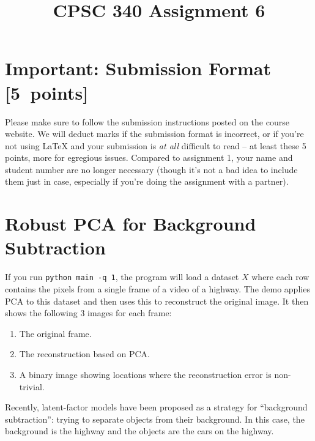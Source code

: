 \documentclass{article}
\newcommand{\blu}[1]{{\textcolor{blu}{#1}}}
\let\ask\blu
\newcommand\pts[1]{\textcolor{pointscolour}{[#1~points]}}
\begin{document}
\title{CPSC 340 Assignment 6}
\date{}
\maketitle

\vspace{-7em}



\section*{Important: Submission Format \pts{5}}

Please make sure to follow the submission instructions posted on the course website.
\ask{We will deduct marks if the submission format is incorrect, or if you're not using \LaTeX{} and your submission is \emph{at all} difficult to read} -- at least these 5 points, more for egregious issues.
Compared to assignment 1, your name and student number are no longer necessary (though it's not a bad idea to include them just in case, especially if you're doing the assignment with a partner).

\vspace{1em}

\section{Robust PCA for Background Subtraction}

If you run \verb|python main -q 1|, the program will load a dataset $X$ where each row contains the pixels from a single frame of a video of a highway. The demo applies PCA to this dataset and then uses this to reconstruct the original image.
It then shows the following 3 images for each frame:
\begin{enumerate}
	\item The original frame.
	\item The reconstruction based on PCA.
	\item A binary image showing locations where the reconstruction error is non-trivial.
\end{enumerate}
Recently, latent-factor models have been proposed as a strategy for ``background subtraction'': trying to separate objects from their background. In this case, the background is the highway and the objects are the cars on the highway.
\end{document}
